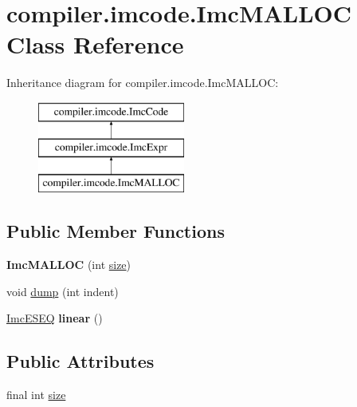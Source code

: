 \hypertarget{classcompiler_1_1imcode_1_1_imc_m_a_l_l_o_c}{}\section{compiler.\+imcode.\+Imc\+M\+A\+L\+L\+OC Class Reference}
\label{classcompiler_1_1imcode_1_1_imc_m_a_l_l_o_c}
Inheritance diagram for compiler.\+imcode.\+Imc\+M\+A\+L\+L\+OC\+:\begin{figure}[H]
\begin{center}
\leavevmode
\includegraphics[height=3.000000cm]{classcompiler_1_1imcode_1_1_imc_m_a_l_l_o_c}
\end{center}
\end{figure}
\subsection*{Public Member Functions}
\begin{DoxyCompactItemize}
\item 
\mbox{\label{classcompiler_1_1imcode_1_1_imc_m_a_l_l_o_c_a106286857a721ac798067fe8a99712b9}} 
{\bfseries Imc\+M\+A\+L\+L\+OC} (int \hyperlink{classcompiler_1_1imcode_1_1_imc_m_a_l_l_o_c_aa598168e8a1d53b2899c55712f4202dd}{size})
\item 
void \hyperlink{classcompiler_1_1imcode_1_1_imc_m_a_l_l_o_c_a6785f2c557644c1c09d834226ed22c1d}{dump} (int indent)
\item 
\mbox{\label{classcompiler_1_1imcode_1_1_imc_m_a_l_l_o_c_ae6c43ae5e7a2ceacf8c8f38b0a1d8779}} 
\hyperlink{classcompiler_1_1imcode_1_1_imc_e_s_e_q}{Imc\+E\+S\+EQ} {\bfseries linear} ()
\end{DoxyCompactItemize}
\subsection*{Public Attributes}
\begin{DoxyCompactItemize}
\item 
final int \hyperlink{classcompiler_1_1imcode_1_1_imc_m_a_l_l_o_c_aa598168e8a1d53b2899c55712f4202dd}{size}
\end{DoxyCompactItemize}


